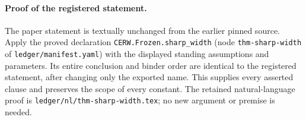 \paragraph{Proof of the registered statement.}
The paper statement is textually unchanged from the earlier pinned source.
Apply the proved declaration \texttt{CERW.Frozen.sharp\_width}
(node \texttt{thm-sharp-width} of \texttt{ledger/manifest.yaml}) with the displayed
standing assumptions and parameters. Its entire conclusion and binder order
are identical to the registered statement, after changing only the exported
name. This supplies every asserted clause and preserves the scope of every
constant. The retained natural-language proof is
\texttt{ledger/nl/thm-sharp-width.tex}; no new argument or premise is needed.
